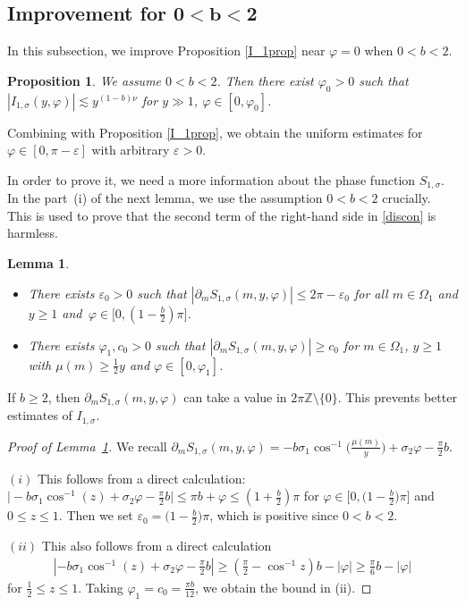 \documentclass[10pt,a4paper]{amsart}
\numberwithin{equation}{section}
\newtheorem{Lemma}[Theorem]{Lemma}
\newtheorem{Proposition}[Theorem]{Proposition}
 { \theoremstyle{definition}
\newtheorem{Definition}[Theorem]{Definition}
\newtheorem{Note}[Theorem]{Note}
\newtheorem{Example}[Theorem]{Example}
\newtheorem{Remark}[Theorem]{Remark} }
\def\e{\varepsilon}
\def\f{\varphi}
\def\m{\mu}
\def\n{\nu}
\def\s{\sigma}
\def\pa{\partial}
\begin{document}
\subsection[Improvement for 0<b<2]{Improvement for $\boldsymbol{0<b<2}$}\label{subsec0b2imp}

In this subsection, we improve Proposition \ref{I_1prop} near $\f=0$ when $0<b<2$.

\begin{Proposition}\label{I_1propimp}
We assume $0<b<2$.
Then there exist $\f_0>0$ such that
$
|I_{1,\s}(y,\f)|\lesssim
y^{(1-b)\n}$ for $y\gg 1$, $ \f\in [0,\f_0]$.
\end{Proposition}

\begin{Remark}
Combining with Proposition \ref{I_1prop}, we obtain the uniform estimates for $\f\in [0,\pi-\e]$ with arbitrary $\e>0$.
\end{Remark}

In order to prove it, we need a more information about the phase function $S_{1,\s}$. In the part~(i) of the next lemma, we use the assumption $0<b<2$ crucially. This is used to prove that the second term of the right-hand side in \eqref{discon} is harmless.

\begin{Lemma}\label{S_1implem}\quad
\begin{itemize}
\item[$(i)$]
There exists $\e_0>0$ such that
$
|\pa_mS_{1,\s}(m,y,\f)|\leq 2\pi-\e_0
$
for all $m\in \Omega_1$ and $y\geq 1$ and~${\f\in \bigl[0,(1-\frac{b}{2})\pi\bigr]}$.

\item[$(ii)$] There exists $\f_1,c_0>0$ such that
$
|\pa_mS_{1,\s}(m,y,\f)|\geq c_0
$
for $m\in \Omega_1$, $y\geq 1$ with $\m(m)\geq \frac{1}{2}y$ and $\f\in [0,\f_1]$.
\end{itemize}
\end{Lemma}

\begin{Remark}
If $b\geq 2$, then $\pa_mS_{1,\s}(m,y,\f)$ can take a value in $2\pi \mathbb{Z}\setminus \{0\}$. This prevents better estimates of $I_{1,\s}$.
\end{Remark}

\begin{proof}[Proof of Lemma~\ref{S_1implem}]
We recall $\pa_mS_{1,\s}(m,y,\f)=-b\s_1\cos^{-1}\bigl(\frac{\m(m)}{y}\bigr)+\s_2\f-\frac{\pi}{2}b$.

 $(i)$
This follows from a direct calculation: $\bigl|-b\s_1\cos^{-1}(z)+\s_2\f-\frac{\pi}{2}b\bigr|\leq \pi b+\f\leq (1+\frac{b}{2})\pi$ for $\f\in \bigl[0,\bigl(1-\frac{b}{2}\bigr)\pi\bigr]$ and $0\le z\le 1$. Then we set $\e_0=\bigl(1-\frac{b}{2}\bigr)\pi$, which is positive since $0<b<2$.

 $(ii)$ This also follows from a direct calculation
\begin{align*}
\left|-b\s_1\cos^{-1}(z)+\s_2\f-\frac{\pi}{2}b\right|\geq \left(\frac{\pi}{2}-\cos^{-1}z\right)b- |\f|\geq \frac{\pi}{6}b-|\f|
\end{align*}
for $\frac{1}{2}\leq z\leq 1$. Taking $\f_1=c_0=\frac{\pi b}{12}$, we obtain the bound in (ii).
\end{proof}
\end{document}
